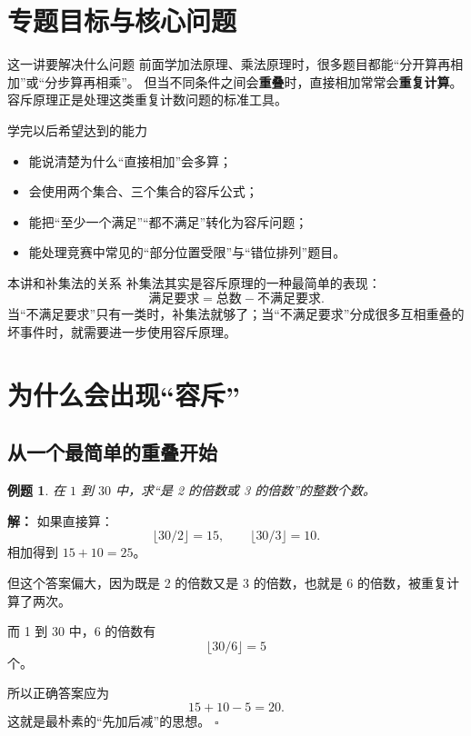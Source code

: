 \documentclass[11pt,a4paper,fontset=fandol]{ctexart}
\theoremstyle{formaltheorem}
\theoremstyle{formalexample}
\newtheorem{example}{例题}[section]
\newenvironment{solution}{\par\noindent\textbf{解：}}{\hfill$\square$\par}
\begin{document}
\pagestyle{plain}
\tableofcontents
\newpage
\pagestyle{fancy}

\section{专题目标与核心问题}

\begin{goalbox}{这一讲要解决什么问题}
前面学加法原理、乘法原理时，很多题目都能“分开算再相加”或“分步算再相乘”。
但当不同条件之间会\textbf{重叠}时，直接相加常常会\textbf{重复计算}。
容斥原理正是处理这类重复计数问题的标准工具。
\end{goalbox}

\begin{goalbox}{学完以后希望达到的能力}
\begin{itemize}
  \item 能说清楚为什么“直接相加”会多算；
  \item 会使用两个集合、三个集合的容斥公式；
  \item 能把“至少一个满足”“都不满足”转化为容斥问题；
  \item 能处理竞赛中常见的“部分位置受限”与“错位排列”题目。
\end{itemize}
\end{goalbox}

\begin{notebox}{本讲和补集法的关系}
补集法其实是容斥原理的一种最简单的表现：
\[
\text{满足要求}=\text{总数}-\text{不满足要求}.
\]
当“不满足要求”只有一类时，补集法就够了；当“不满足要求”分成很多互相重叠的坏事件时，就需要进一步使用容斥原理。
\end{notebox}

\section{为什么会出现“容斥”}

\subsection{从一个最简单的重叠开始}

\begin{example}
在 $1$ 到 $30$ 中，求“是 2 的倍数或 3 的倍数”的整数个数。
\end{example}

\begin{solution}
如果直接算：
\[
\lfloor 30/2\rfloor=15,
\qquad
\lfloor 30/3\rfloor=10.
\]
相加得到 $15+10=25$。

但这个答案偏大，因为既是 2 的倍数又是 3 的倍数，也就是 6 的倍数，被重复计算了两次。

而 1 到 30 中，6 的倍数有
\[
\lfloor 30/6\rfloor=5
\]
个。

所以正确答案应为
\[
15+10-5=20.
\]
这就是最朴素的“先加后减”的思想。
\end{solution}
\end{document}
